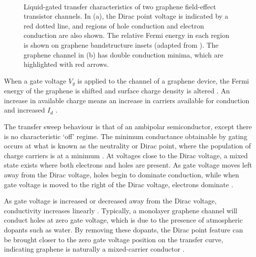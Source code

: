 \documentclass[
  a4paper,
]{scrbook}
\begin{document}
\begin{figure}
\begin{minipage}[t]{0.45\linewidth}
\end{minipage}%
%
\begin{minipage}[t]{0.01\linewidth}

{\centering 

~

}

\end{minipage}%

\caption{\label{fig-graphene-characteristics}Liquid-gated transfer
characteristics of two graphene field-effect transistor channels. In
(a), the Dirac point voltage is indicated by a red dotted line, and
regions of hole conduction and electron conduction are also shown. The
relative Fermi energy in each region is shown on graphene bandstructure
insets (adapted from \autocite{Geim2007,Ohno2015}). The graphene channel
in (b) has double conduction minima, which are highlighted with red
arrows.}

\end{figure}

When a gate voltage \(V_g\) is applied to the channel of a graphene
device, the Fermi energy of the graphene is shifted and surface charge
density is altered \autocite{Novoselov2004,Heller2010,Ohno2015}. An
increase in available charge means an increase in carriers available for
conduction and increased \(I_d\) \autocite{Geim2007}.

The transfer sweep behaviour is that of an ambipolar semiconductor,
except there is no characteristic `off' regime. The minimum conductance
obtainable by gating occurs at what is known as the neutrality or Dirac
point, where the population of charge carriers is at a minimum
\autocite{Novoselov2004,Ohno2015}. At voltages close to the Dirac
voltage, a mixed state exists where both electrons and holes are
present. As gate voltage moves left away from the Dirac voltage, holes
begin to dominate conduction, while when gate voltage is moved to the
right of the Dirac voltage, electrons dominate \autocite{Novoselov2004}.

As gate voltage is increased or decreased away from the Dirac voltage,
conductivity increases linearly \autocite{Novoselov2004}. Typically, a
monolayer graphene channel will conduct holes at zero gate voltage,
which is due to the presence of atmospheric dopants such as water. By
removing these dopants, the Dirac point feature can be brought closer to
the zero gate voltage position on the transfer curve, indicating
graphene is naturally a mixed-carrier conductor
\autocite{Novoselov2004}.
\end{document}
